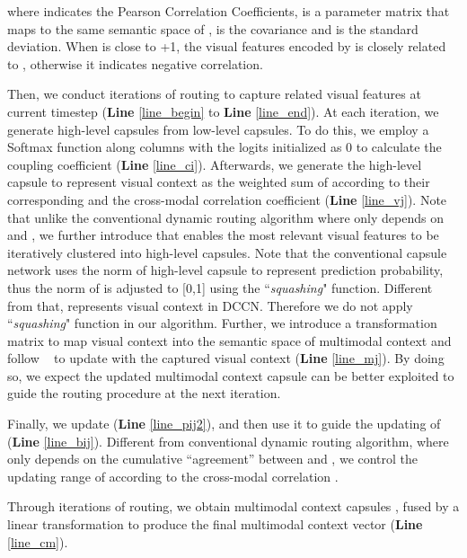 \documentclass[sigconf]{acmart}
\begin{document}
where  indicates the Pearson Correlation Coefficients,  is a parameter matrix that maps  to the same semantic space of ,  is the covariance and  is the standard deviation. 
When  is close to +1, 
the visual features encoded by  is closely related to , 
otherwise it indicates negative correlation. 






Then, 
we conduct  iterations of routing to capture related visual features at current timestep (\textbf{Line} \ref{line_begin} to \textbf{Line} \ref{line_end}).
At each iteration,
we generate high-level capsules from low-level capsules.
To do this,
we employ a Softmax function along columns with the logits  initialized as 0 to calculate the coupling coefficient  (\textbf{Line} \ref{line_ci}). 
Afterwards, we generate the high-level capsule  to represent visual context as the weighted sum of  according to their corresponding  and the cross-modal correlation coefficient  (\textbf{Line} \ref{line_vj}). 
Note that unlike the conventional dynamic routing algorithm \cite{sabour2017dynamic} where  only depends on  and , 
we further introduce  that enables the most relevant visual features to be iteratively clustered into high-level capsules.
Note that the conventional capsule network \cite{sabour2017dynamic} uses the norm of high-level capsule to represent prediction probability, thus the norm of  is adjusted to [0,1] using the ``\emph{squashing}" function.   
Different from that,  represents visual context in DCCN. Therefore we do not apply ``\emph{squashing}" function in our algorithm. 
Further, we introduce a transformation matrix  to map visual context  into the semantic space of multimodal context and follow \citeauthor{wu2019faithful}~ to update  with the captured visual context  (\textbf{Line} \ref{line_mj}). By doing so, 
we expect the updated multimodal context capsule can be better exploited to guide the routing procedure at the next iteration. 

Finally, we update  (\textbf{Line }\ref{line_pij2}), and then use it to guide the updating of  (\textbf{Line }\ref{line_bij}). Different from conventional dynamic routing algorithm, where  only depends on the cumulative ``agreement'' between  and , we control the updating range of  according to the cross-modal correlation .


Through  iterations of routing, we obtain  multimodal context capsules  ,  fused by a linear transformation to produce the final multimodal context vector  (\textbf{Line} \ref{line_cm}). 
\end{document}
